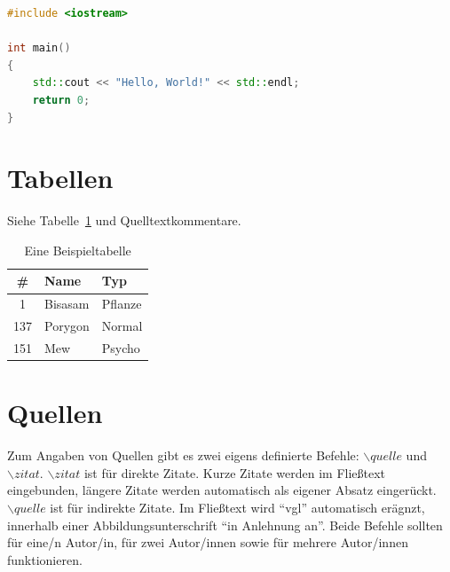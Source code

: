 \documentclass{iwi}
\begin{document}
\begin{lstlisting}[float, caption={Hello, World!}, label={lst:helloWorld}, language=C++] 
#include <iostream>

int main() 
{
    std::cout << "Hello, World!" << std::endl;
    return 0;
}
\end{lstlisting}

\section{Tabellen} \label{sec:Tabellen}

Siehe Tabelle~\ref{tbl:pokemon} und Quelltextkommentare.

\begin{table}
\begin{center}
\begin{tabular}{c|ll} %
	\# & Name & Typ	\\
	\hline   
	1      & Bisasam   & Pflanze   \\
	137    & Porygon   & Normal    \\
	151    & Mew       & Psycho    \\

\end{tabular}
\caption{Eine Beispieltabelle}
\label{tbl:pokemon}
\end{center}
\end{table}

\section{Quellen}

Zum Angaben von Quellen gibt es zwei eigens definierte Befehle: $\backslash quelle$ und $\backslash zitat$.
$\backslash zitat$ ist für direkte Zitate. Kurze Zitate werden im Fließtext eingebunden, längere Zitate werden automatisch als eigener Absatz eingerückt.
$\backslash quelle$ ist für indirekte Zitate. 
Im Fließtext wird ``vgl'' automatisch erägnzt, innerhalb einer Abbildungsunterschrift ``in Anlehnung an''. 
Beide Befehle sollten für eine/n Autor/in, für zwei Autor/innen sowie für mehrere Autor/innen funktionieren.
\end{document}
